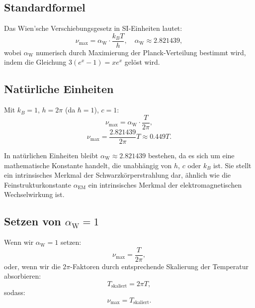 \documentclass[12pt,a4paper]{article}
\newcommand{\alphaEM}{\alpha_{\text{EM}}}
\newcommand{\alphaW}{\alpha_{\text{W}}}
\begin{document}
	\subsection{Standardformel}
	\label{subsec:standard_formula}
	
	Das Wien'sche Verschiebungsgesetz in SI-Einheiten lautet:
	\[
	\nu_{\text{max}} = \alphaW \cdot \frac{k_B T}{h}, \quad \alphaW \approx 2.821439,
	\]
	wobei \(\alphaW\) numerisch durch Maximierung der Planck-Verteilung bestimmt wird, indem die Gleichung \(3 (e^x - 1) = x e^x\) gelöst wird.
	
	\subsection{Natürliche Einheiten}
	\label{subsec:natural_units}
	
	Mit \(k_B = 1\), \(h = 2\pi\) (da \(\hbar = 1\)), \(c = 1\):
	\[
	\nu_{\text{max}} = \alphaW \cdot \frac{T}{2\pi},
	\]
	\[
	\nu_{\text{max}} = \frac{2.821439}{2\pi} T \approx 0.449 T.
	\]
	
	In natürlichen Einheiten bleibt \(\alphaW \approx 2.821439\) bestehen, da es sich um eine mathematische Konstante handelt, die unabhängig von \(h\), \(c\) oder \(k_B\) ist. Sie stellt ein intrinsisches Merkmal der Schwarzkörperstrahlung dar, ähnlich wie die Feinstrukturkonstante \(\alphaEM\) ein intrinsisches Merkmal der elektromagnetischen Wechselwirkung ist.
	
	\subsection{Setzen von \(\alphaW = 1\)}
	\label{subsec:setting_alpha_w}
	
	Wenn wir \(\alphaW = 1\) setzen:
	\[
	\nu_{\text{max}} = \frac{T}{2\pi},
	\]
	oder, wenn wir die \(2\pi\)-Faktoren durch entsprechende Skalierung der Temperatur absorbieren:
	\[
	T_{\text{skaliert}} = 2\pi T,
	\]
	sodass:
	\[
	\nu_{\text{max}} = T_{\text{skaliert}}.
	\]
	
\end{document}
